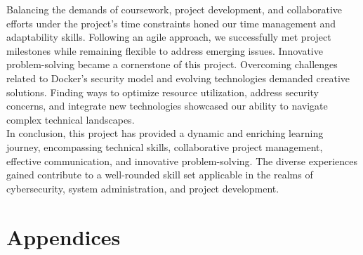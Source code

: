 \documentclass[a4paper,11pt,singlespacing]{article}
\begin{document}
Balancing the demands of coursework, project development, and collaborative efforts under the project’s time constraints honed our time management and adaptability skills. Following an agile approach, we successfully met project milestones while remaining flexible to address emerging issues. Innovative problem-solving became a cornerstone of this project. Overcoming challenges related to Docker’s security model and evolving technologies demanded creative solutions. Finding ways to optimize resource utilization, address security concerns, and integrate new technologies showcased our ability to navigate complex technical landscapes.\\

In conclusion, this project has provided a dynamic and enriching learning journey, encompassing technical skills, collaborative project management, effective communication, and innovative problem-solving. The diverse experiences gained contribute to a well-rounded skill set applicable in the realms of cybersecurity, system administration, and project development.


\newpage
\section{Appendices}
\end{document}
